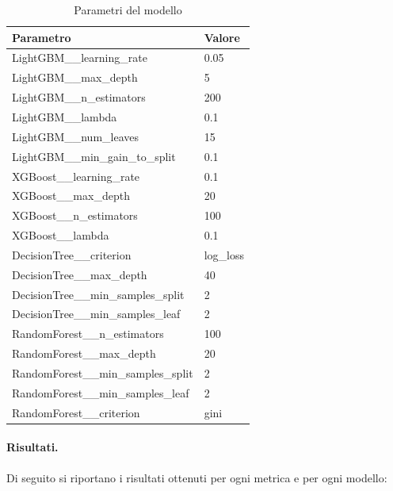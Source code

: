 \begin{table}[H]
    \centering
    \begin{tabular}{|l|l|}
    \toprule
    \textbf{Parametro}                 & \textbf{Valore} \\ \midrule
    LightGBM\_\_learning\_rate            & 0.05            \\ 
    LightGBM\_\_max\_depth                & 5               \\ 
    LightGBM\_\_n\_estimators             & 200             \\ 
    LightGBM\_\_lambda                    & 0.1             \\ 
    LightGBM\_\_num\_leaves               & 15              \\ 
    LightGBM\_\_min\_gain\_to\_split      & 0.1             \\ 
    XGBoost\_\_learning\_rate         & 0.1             \\ 
    XGBoost\_\_max\_depth             & 20              \\ 
    XGBoost\_\_n\_estimators          & 100             \\ 
    XGBoost\_\_lambda                 & 0.1             \\ 
    DecisionTree\_\_criterion         & log\_loss       \\ 
    DecisionTree\_\_max\_depth        & 40              \\ 
    DecisionTree\_\_min\_samples\_split & 2               \\ 
    DecisionTree\_\_min\_samples\_leaf & 2               \\ 
    RandomForest\_\_n\_estimators     & 100             \\ 
    RandomForest\_\_max\_depth        & 20              \\ 
    RandomForest\_\_min\_samples\_split & 2               \\ 
    RandomForest\_\_min\_samples\_leaf & 2               \\ 
    RandomForest\_\_criterion         & gini            \\ \bottomrule
    \end{tabular}
    \caption{Parametri del modello}
    
    \end{table}

\paragraph{Risultati.} Di seguito si riportano i risultati ottenuti per ogni metrica e per ogni modello:


